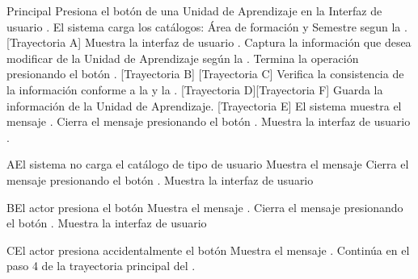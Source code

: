 \begin{UCtrayectoria}{Principal}
    \UCpaso[\UCactor] Presiona el botón  de una Unidad de Aprendizaje en la Interfaz de usuario  .
    \UCpaso El sistema carga los catálogos: Área de formación y Semestre segun la . [Trayectoria A]
    \UCpaso Muestra la interfaz de usuario .
 	\UCpaso[\UCactor] Captura la información que desea modificar de la Unidad de Aprendizaje según la .
 	\UCpaso[\UCactor] Termina la operación presionando el botón . [Trayectoria B] [Trayectoria C]
 	\UCpaso Verifica la consistencia de la información conforme a la  y la . [Trayectoria D][Trayectoria F]
 	\UCpaso Guarda la información de la Unidad de Aprendizaje. [Trayectoria E]
 	\UCpaso El sistema muestra el mensaje .
 	\UCpaso[\UCactor] Cierra el mensaje presionando el botón .
 	\UCpaso Muestra la interfaz de usuario .
\end{UCtrayectoria}
\begin{UCtrayectoriaA}{A}{El sistema no carga el catálogo de tipo de usuario}
	\UCpaso Muestra el mensaje 
	\UCpaso[\UCactor] Cierra el mensaje presionando el botón .
	 \UCpaso Muestra la interfaz de usuario 
\end{UCtrayectoriaA}
\begin{UCtrayectoriaA}{B}{El actor presiona el botón }
	\UCpaso Muestra el mensaje .
	\UCpaso[\UCactor] Cierra el mensaje presionando el botón .
	\UCpaso Muestra la interfaz de usuario 
\end{UCtrayectoriaA}
\begin{UCtrayectoriaA}{C}{El actor presiona accidentalmente el botón }
	\UCpaso Muestra el mensaje .
    \UCpaso Continúa en el paso 4 de la trayectoria principal del .
\end{UCtrayectoriaA}
